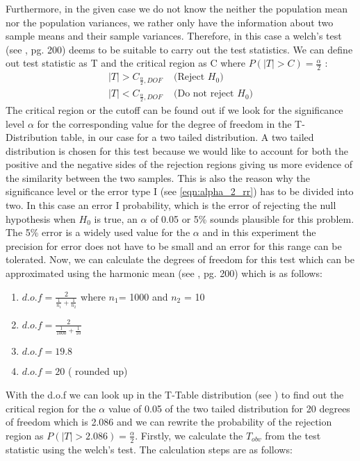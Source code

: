 Furthermore, in the given case we do not know the neither the population mean nor the population variances, we rather only have the information about two sample means and their sample variances. Therefore, in this case a welch's test (see \cite{Iubh:2021}, pg. 200) deems to be suitable to carry out the test statistics. We can define out test statistic as T and the critical region as C where $P(|T| > C) =\frac{\alpha}{2}$ \label{eqn:alpha_2_rr}:
\begin{equation}
    \begin{split}
      |T| > C_{\frac{\alpha}{2}, DOF}& \text{ (Reject $H_0$)}\\
      |T| < C_{\frac{\alpha}{2}, DOF}& \text{ (Do not reject $H_0$)}
    \end{split}
\end{equation}
The critical region or the cutoff can be found out if we look for the significance level $\alpha$ for the corresponding value for the degree of freedom in the T-Distribution table, in our case for a two tailed distribution. A two tailed distribution is chosen for this test because we would like to account for both the positive and the negative sides of the rejection regions giving us more evidence of the similarity between the two samples. This is also the reason why the significance level or the error type I (see \ref{eqn:alpha_2_rr}) has to be divided into two. \newline \newline
In this case an error I probability, which is the error of rejecting the null hypothesis when $H_0$ is true, an $\alpha$ of 0.05 or 5\% sounds plausible for this problem. The 5\% error is a widely used value for the $\alpha$ and in this experiment the precision for error does not have to be small and an error for this range can be tolerated. Now, we can calculate the degrees of freedom for this test which can be approximated using the harmonic mean (see \cite{Iubh:2021}, pg. 200) which is as follows:
\begin{enumerate}
    \item $d.o.f = \frac{2}{\frac{1}{n_1}+\frac{1}{n_2}}$ where $n_1$= 1000 and $n_2$ = 10
    \item $d.o.f = \frac{2}{\frac{1}{1000}+\frac{1}{10}}$
    \item $d.o.f = 19.8$
    \item $d.o.f = 20$ ( rounded up)
\end{enumerate}
With the d.o.f we can look up in the T-Table distribution (see \cite{t-table}) to find out the critical region for the $\alpha$ value of 0.05 of the two tailed distribution for 20 degrees of freedom which is 2.086 and we can rewrite the probability of the rejection region as $P(|T| > 2.086) = \frac{\alpha}{2}$. Firstly, we calculate the $T_{obv}$ from the test statistic using the welch's test. The calculation steps are as follows:
